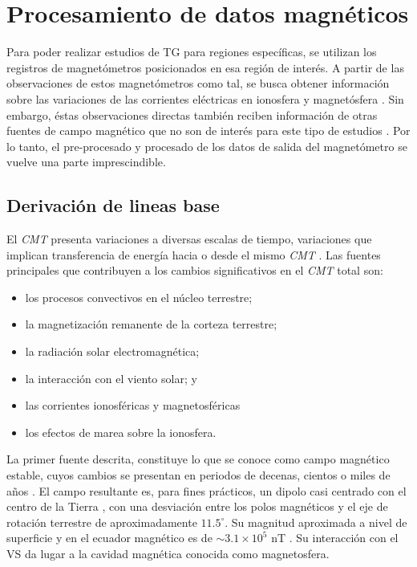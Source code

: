 \section{Procesamiento de datos magnéticos}

Para poder realizar estudios de TG para regiones específicas, se utilizan los registros de magnetómetros posicionados en esa región de interés. A partir de las observaciones de estos magnetómetros como tal, se busca obtener información sobre las variaciones de las corrientes eléctricas en ionosfera y magnetósfera \cite{BARTELS_kp}. Sin embargo, éstas observaciones directas también reciben información de otras fuentes de campo magnético que no son de interés para este tipo de estudios \cite{amorymazaudier_2017, amory2020_filtros}. Por lo tanto, el pre-procesado y procesado de los datos de salida del magnetómetro se vuelve una parte imprescindible.
\vspace{1 em}

\subsection{Derivación de lineas base}

El \emph{CMT} presenta variaciones a diversas escalas de tiempo, variaciones que implican transferencia de energía hacia o desde el mismo \emph{CMT} \cite{l_handbook_geof_sw_Geom_field}. Las fuentes principales que contribuyen a los cambios significativos en el \emph{CMT} total son:
\begin{itemize}
    \item los procesos convectivos en el núcleo terrestre;
    \item la magnetización remanente de la corteza terrestre;
    \item la radiación solar electromagnética;
    \item la interacción con el viento solar; y
    \item las corrientes ionosféricas y magnetosféricas
    \item los efectos de marea sobre la ionosfera.    
\end{itemize}

La primer fuente descrita, constituye lo que se conoce como campo magnético estable, cuyos cambios se presentan en periodos de decenas, cientos o miles de años \cite{l_handbook_geof_sw_Geom_field}. El campo resultante es, para fines prácticos, un dipolo casi centrado con el centro de la Tierra \cite{hargreaves_1992}, con una desviación entre los polos magnéticos y el eje de rotación terrestre de aproximadamente $11.5^\circ$. Su magnitud aproximada a nivel de superficie y en el ecuador magnético es de $\sim 3.1 \times 10^{5}$ nT \cite{l_handbook_geof_sw_Geom_field, l_basic_spaceplasmaphysic, l_russell}. Su interacción con el VS da lugar a la cavidad magnética conocida como magnetosfera.\\
\vspace{1 em}

